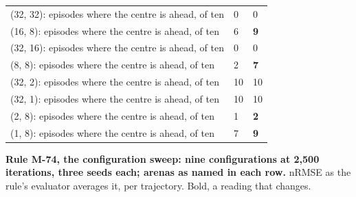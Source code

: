 \documentclass[10pt]{article}
\begin{document}
\begin{center}
{\begin{tabular}{lll}
(32, 32): episodes where the centre is ahead, of ten & 0 & 0 \\
(16, 8): episodes where the centre is ahead, of ten & 6 & \textbf{9} \\
(32, 16): episodes where the centre is ahead, of ten & 0 & 0 \\
(8, 8): episodes where the centre is ahead, of ten & 2 & \textbf{7} \\
(32, 2): episodes where the centre is ahead, of ten & 10 & 10 \\
(32, 1): episodes where the centre is ahead, of ten & 10 & 10 \\
(2, 8): episodes where the centre is ahead, of ten & 1 & \textbf{2} \\
(1, 8): episodes where the centre is ahead, of ten & 7 & \textbf{9} \\
\bottomrule\end{tabular}}\end{center}

\textbf{Rule M-74, the configuration sweep: nine configurations at 2,500 iterations, three seeds each; arenas as named in each row.} nRMSE as the rule's evaluator averages it, per trajectory. Bold, a reading that changes.
\end{document}
